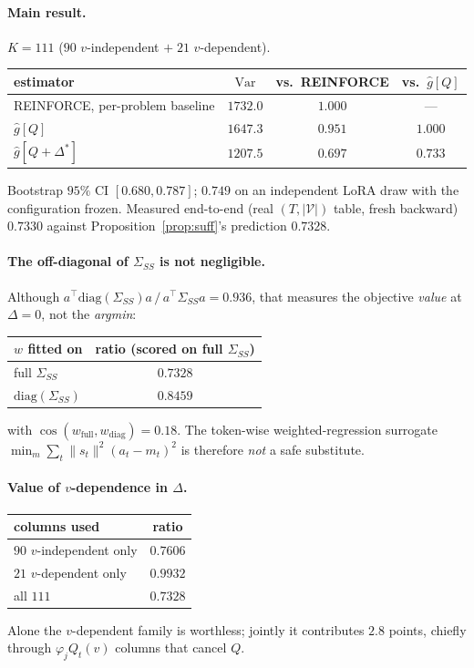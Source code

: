 \documentclass{article}
\theoremstyle{plain}
\theoremstyle{definition}
\DeclareMathOperator{\Var}{Var}
\begin{document}
\paragraph{Main result.} $K=111$ ($90$ $v$-independent $+\;21$ $v$-dependent).
\begin{center}
\begin{tabular}{lccc}
\hline
estimator & $\Var$ & vs.\ REINFORCE & vs.\ $\hat g[Q]$\\
\hline
REINFORCE, per-problem baseline & $1732.0$ & $1.000$ & ---\\
$\hat g[Q]$ & $1647.3$ & $0.951$ & $1.000$\\
$\hat g[Q+\Delta^*]$ & $1207.5$ & $0.697$ & $\mathbf{0.733}$\\
\hline
\end{tabular}
\end{center}
Bootstrap $95\%$ CI $[0.680,0.787]$; $0.749$ on an independent LoRA draw with the configuration frozen.
Measured end-to-end (real $(T,|\mathcal{V}|)$ table, fresh backward) $0.7330$ against
Proposition~\ref{prop:suff}'s prediction $0.7328$.

\paragraph{The off-diagonal of $\Sigma_{SS}$ is not negligible.}
Although $a^\top\mathrm{diag}(\Sigma_{SS})a\,/\,a^\top\Sigma_{SS}a=0.936$, that measures the objective
\emph{value} at $\Delta=0$, not the \emph{argmin}:
\begin{center}
\begin{tabular}{lc}
\hline
$w$ fitted on & ratio (scored on full $\Sigma_{SS}$)\\
\hline
full $\Sigma_{SS}$ & $0.7328$\\
$\mathrm{diag}(\Sigma_{SS})$ & $0.8459$\\
\hline
\end{tabular}
\end{center}
with $\cos(w_{\text{full}},w_{\text{diag}})=0.18$. The token-wise weighted-regression surrogate
$\min_m\sum_t\|s_t\|^2(a_t-m_t)^2$ is therefore \emph{not} a safe substitute.

\paragraph{Value of $v$-dependence in $\Delta$.}
\begin{center}
\begin{tabular}{lc}
\hline
columns used & ratio\\
\hline
$90$ $v$-independent only & $0.7606$\\
$21$ $v$-dependent only & $0.9932$\\
all $111$ & $0.7328$\\
\hline
\end{tabular}
\end{center}
Alone the $v$-dependent family is worthless; jointly it contributes $2.8$ points, chiefly through
$\varphi_j Q_t(v)$ columns that cancel $Q$.
\end{document}
